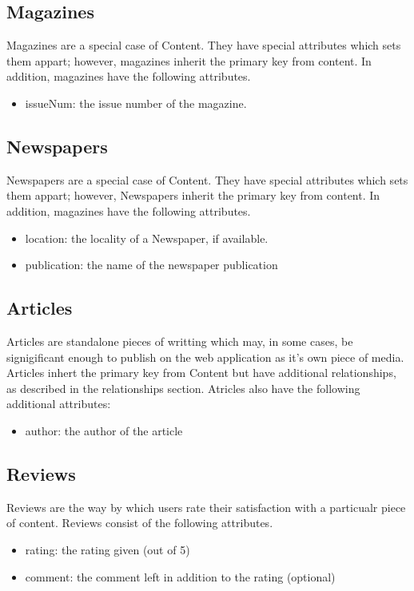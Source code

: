 \documentclass[letter, 12pt, titlepage]{article}
\begin{document}
			\subsection{Magazines}
				Magazines are a special case of Content. They have special attributes which sets them appart; however, magazines inherit the primary key from content. In addition, magazines have the following attributes.
			\begin{itemize}
				\item issueNum: the issue number of the magazine.
			\end{itemize}		
			\subsection{Newspapers} 
				Newspapers are a special case of Content. They have special attributes which sets them appart; however, Newspapers inherit the primary key from content. In addition, magazines have the following attributes.
			\begin{itemize}
				\item location: the locality of a Newspaper, if available.
				\item publication: the name of the newspaper publication
			\end{itemize}		
				
			\subsection{Articles}		
			Articles are standalone pieces of writting which may, in some cases, be signigificant enough to publish on the web application as it's own piece of media. Articles inhert the primary key from Content but have additional relationships, as described in the relationships section. Atricles also have the following additional attributes:
			\begin{itemize}
				\item author: the author of the article
			\end{itemize}
			\subsection{Reviews}
			Reviews are the way by which users rate their satisfaction with a particualr piece of content. Reviews consist of the following attributes. 
			\begin{itemize}
				\item rating: the rating given (out of 5)
				\item comment: the comment left in addition to the rating (optional)
			\end{itemize}
\end{document}
